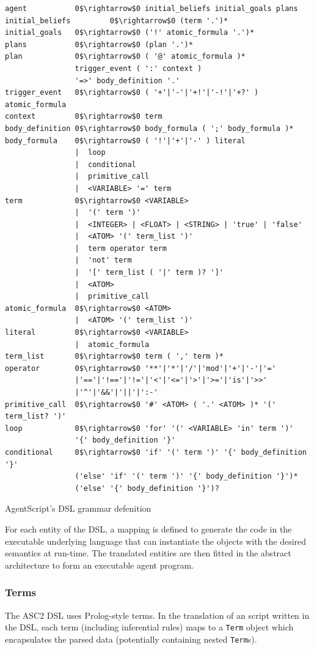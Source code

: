 \begin{listing} 
\begin{verbatim}
agent           0$\rightarrow$0 initial_beliefs initial_goals plans
initial_beliefs         0$\rightarrow$0 (term '.')*
initial_goals   0$\rightarrow$0 ('!' atomic_formula '.')*
plans           0$\rightarrow$0 (plan '.')*
plan            0$\rightarrow$0 ( '@' atomic_formula )*
                trigger_event ( ':' context )
                '=>' body_definition '.'
trigger_event   0$\rightarrow$0 ( '+'|'-'|'+!'|'-!'|'+?' ) atomic_formula
context         0$\rightarrow$0 term
body_definition 0$\rightarrow$0 body_formula ( ';' body_formula )*
body_formula    0$\rightarrow$0 ( '!'|'+'|'-' ) literal
                |  loop
                |  conditional
                |  primitive_call
                |  <VARIABLE> '=' term
term            0$\rightarrow$0 <VARIABLE>
                |  '(' term ')'
                |  <INTEGER> | <FLOAT> | <STRING> | 'true' | 'false' 
                |  <ATOM> '(' term_list ')'
                |  term operator term
                |  'not' term
                |  '[' term_list ( '|' term )? ']'
                |  <ATOM>
                |  primitive_call
atomic_formula  0$\rightarrow$0 <ATOM>
                |  <ATOM> '(' term_list ')'
literal         0$\rightarrow$0 <VARIABLE> 
                |  atomic_formula               
term_list       0$\rightarrow$0 term ( ',' term )*
operator        0$\rightarrow$0 '**'|'*'|'/'|'mod'|'+'|'-'|'='
                |'=='|'!=='|'!='|'<'|'<='|'>'|'>='|'is'|'>>'
                |'^'|'&&'|'||'|':-'
primitive_call  0$\rightarrow$0 '#' <ATOM> ( '.' <ATOM> )* '(' term_list? ')'
loop            0$\rightarrow$0 'for' '(' <VARIABLE> 'in' term ')' 
                '{' body_definition '}'
conditional     0$\rightarrow$0 'if' '(' term ')' '{' body_definition '}'
                ('else' 'if' '(' term ')' '{' body_definition '}')*
                ('else' '{' body_definition '}')?
\end{verbatim}
\caption{AgentScript's DSL grammar defenition}
\label{listings:asc2grammar}
\end{listing}%

For each entity of the DSL, a mapping is defined to generate the code in the executable underlying language that can instantiate the objects with the desired semantics at run-time. The translated entities are then fitted in the abstract architecture to form an executable agent program.

\subsubsection{Terms}
The ASC2 DSL uses Prolog-style terms. In the translation of an script written in the DSL, each term (including inferential rules) maps to a \verb+Term+ object which encapsulates the parsed data (potentially containing nested \verb+Term+s).

